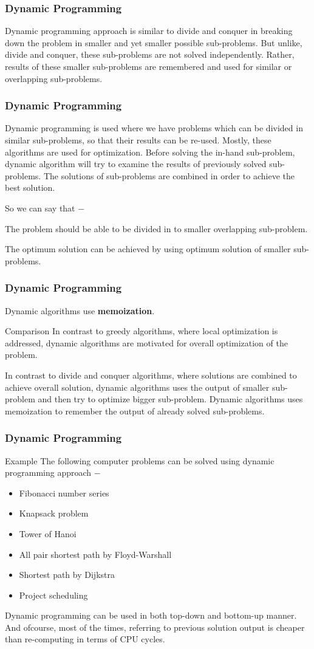 \documentclass[algocomplexity.tex]{subfiles}
\begin{document}
\begin{frame}
\frametitle{Dynamic Programming}
\large

Dynamic programming approach is similar to divide and conquer in breaking down the problem in smaller and yet smaller possible sub-problems. But unlike, divide and conquer, these sub-problems are not solved independently. Rather, results of these smaller sub-problems are remembered and used for similar or overlapping sub-problems.
\end{frame}
\begin{frame}
\frametitle{Dynamic Programming}
\large
Dynamic programming is used where we have problems which can be divided in similar sub-problems, so that their results can be re-used. Mostly, these algorithms are used for optimization. Before solving the in-hand sub-problem, dynamic algorithm will try to examine the results of previously solved sub-problems. The solutions of sub-problems are combined in order to achieve the best solution.

So we can say that −

The problem should be able to be divided in to smaller overlapping sub-problem.

The optimum solution can be achieved by using optimum solution of smaller sub-problems.
\end{frame}
\begin{frame}
\frametitle{Dynamic Programming}
\large
Dynamic algorithms use \textbf{memoization}.

Comparison
In contrast to greedy algorithms, where local optimization is addressed, dynamic algorithms are motivated for overall optimization of the problem.

In contrast to divide and conquer algorithms, where solutions are combined to achieve overall solution, dynamic algorithms uses the output of smaller sub-problem and then try to optimize bigger sub-problem. Dynamic algorithms uses memoization to remember the output of already solved sub-problems.
\end{frame}
\begin{frame}
\frametitle{Dynamic Programming}
\large
Example
The following computer problems can be solved using dynamic programming approach −
\begin{itemize}
\item 
Fibonacci number series
\item Knapsack problem
\item Tower of Hanoi
\item All pair shortest path by Floyd-Warshall
\item Shortest path by Dijkstra
\item Project scheduling
\end{itemize}

Dynamic programming can be used in both top-down and bottom-up manner. And ofcourse, most of the times, referring to previous solution output is cheaper than re-computing in terms of CPU cycles.
 
\end{frame}
\end{document}

